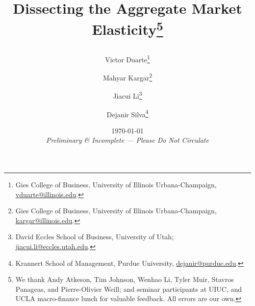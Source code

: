 \usepackage[en-US]{datetime2}
\usepackage{mathtools}
\usepackage{xcolor}
\usepackage[textsize=footnotesize]{todonotes}

\usepackage{physics}
\usepackage{amsmath}
\usepackage{tikz}
\usepackage{mathdots}
\usepackage{cancel}
\usepackage{color}
\usepackage{siunitx}
\usepackage{array}
\usepackage{multirow}
\usepackage{amssymb}
\usepackage{gensymb}
\usepackage{tabularx}
\usepackage{extarrows}
\usepackage{booktabs}
\usetikzlibrary{fadings}
\usetikzlibrary{patterns}
\usetikzlibrary{shadows.blur}
\usetikzlibrary{shapes}




\newcommand{\comments}[1]
{\par {\bfseries \color{blue} #1 \par}}


\title{\textbf{Dissecting the Aggregate Market Elasticity\thanks{We thank Andy Atkeson, Tim Johnson, Wenhao Li, Tyler Muir, Stavros Panageas, and Pierre-Olivier Weill; and seminar participants at UIUC, and UCLA macro-finance lunch for valuable feedback. All errors are our own.}}
\author{ 
Victor Duarte\thanks{Gies College of Business, University of Illinois Urbana-Champaign, \href{mailto:vduarte@illinois.edu}{vduarte@illinois.edu}.}\and 
Mahyar Kargar\thanks{Gies College of Business, University of Illinois Urbana-Champaign, \href{mailto:kargar@illinois.edu}{kargar@illinois.edu}.}\and Jiacui Li\thanks{David Eccles School of Business, University of Utah; \href{mailto:jiacui.li@eccles.utah.edu}{jiacui.li@eccles.utah.edu}.} \and  Dejanir Silva\thanks{Krannert School of Management, Purdue University, \href{dejanir@purdue.edu}{dejanir@purdue.edu}.}}
}
\date{\today \\
	\vspace{0.5cm}
	\textit{Preliminary \& Incomplete --- Please Do Not Circulate}
	\vspace{1cm}}



  \sloppy
  \maketitle
  \thispagestyle{empty}
  
